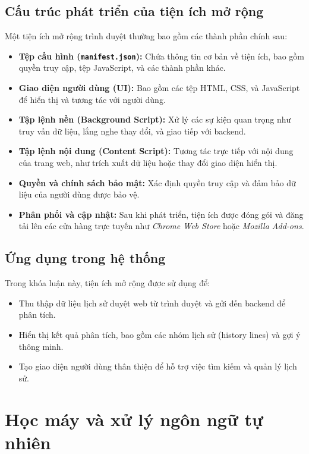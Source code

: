 \subsection{Cấu trúc phát triển của tiện ích mở rộng}

Một tiện ích mở rộng trình duyệt thường bao gồm các thành phần chính sau:
\begin{itemize}
    \item \textbf{Tệp cấu hình (\texttt{manifest.json}):} Chứa thông tin cơ bản về tiện ích, bao gồm quyền truy cập, tệp JavaScript, và các thành phần khác.
    \item \textbf{Giao diện người dùng (UI):} Bao gồm các tệp HTML, CSS, và JavaScript để hiển thị và tương tác với người dùng.
    \item \textbf{Tập lệnh nền (Background Script):} Xử lý các sự kiện quan trọng như truy vấn dữ liệu, lắng nghe thay đổi, và giao tiếp với backend.
    \item \textbf{Tập lệnh nội dung (Content Script):} Tương tác trực tiếp với nội dung của trang web, như trích xuất dữ liệu hoặc thay đổi giao diện hiển thị.
    \item \textbf{Quyền và chính sách bảo mật:} Xác định quyền truy cập và đảm bảo dữ liệu của người dùng được bảo vệ.
    \item \textbf{Phân phối và cập nhật:} Sau khi phát triển, tiện ích được đóng gói và đăng tải lên các cửa hàng trực tuyến như \textit{Chrome Web Store} hoặc \textit{Mozilla Add-ons}.
\end{itemize}

\subsection{Ứng dụng trong hệ thống}

Trong khóa luận này, tiện ích mở rộng được sử dụng để:
\begin{itemize}
    \item Thu thập dữ liệu lịch sử duyệt web từ trình duyệt và gửi đến backend để phân tích.
    \item Hiển thị kết quả phân tích, bao gồm các nhóm lịch sử (history lines) và gợi ý thông minh.
    \item Tạo giao diện người dùng thân thiện để hỗ trợ việc tìm kiếm và quản lý lịch sử.
\end{itemize}

\section{Học máy và xử lý ngôn ngữ tự nhiên}

